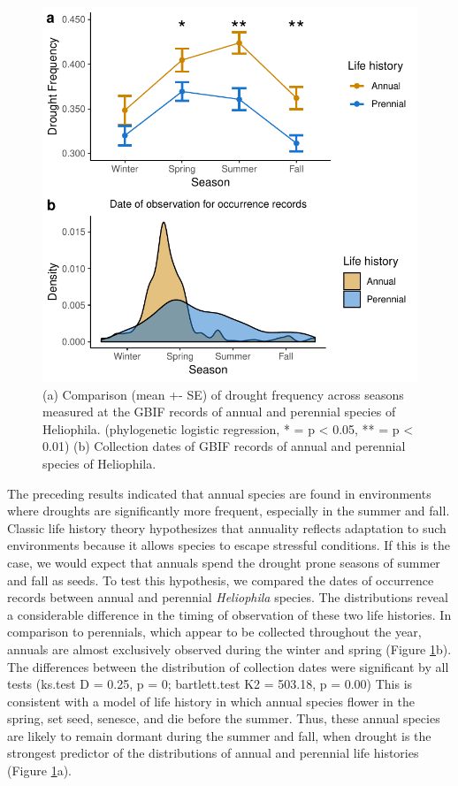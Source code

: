 \documentclass[man,floatsintext]{apa6}
\theoremstyle{definition}
\theoremstyle{definition}
\theoremstyle{definition}
\theoremstyle{remark}
\begin{document}
\begin{figure}[!h]
\includegraphics[width=\textwidth]{../figures/line_and_dates} \caption{(a) Comparison (mean +- SE) of drought frequency across
seasons measured at the GBIF records of annual and perennial species of
Heliophila. (phylogenetic logistic regression, * = p \textless{} 0.05,
** = p \textless{} 0.01) (b) Collection dates of GBIF records of annual
and perennial species of Heliophila.}\label{fig:lineplots}
\end{figure}

The preceding results indicated that annual species are found in
environments where droughts are significantly more frequent, especially
in the summer and fall. Classic life history theory hypothesizes that
annuality reflects adaptation to such environments because it allows
species to escape stressful conditions. If this is the case, we would
expect that annuals spend the drought prone seasons of summer and fall
as seeds. To test this hypothesis, we compared the dates of occurrence
records between annual and perennial \emph{Heliophila} species. The
distributions reveal a considerable difference in the timing of
observation of these two life histories. In comparison to perennials,
which appear to be collected throughout the year, annuals are almost
exclusively observed during the winter and spring (Figure
\ref{fig:lineplots}b). The differences between the distribution of
collection dates were significant by all tests (ks.test D = 0.25, p = 0;
bartlett.test K2 = 503.18, p = 0.00) This is consistent with a model of
life history in which annual species flower in the spring, set seed,
senesce, and die before the summer. Thus, these annual species are
likely to remain dormant during the summer and fall, when drought is the
strongest predictor of the distributions of annual and perennial life
histories (Figure \ref{fig:lineplots}a).
\end{document}
